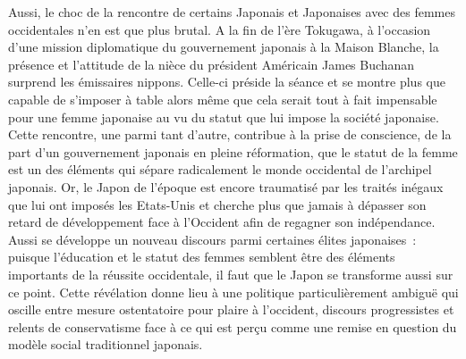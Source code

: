\documentclass[11pt,a4paper]{article}
\begin{document}
Aussi, le choc de la rencontre de certains Japonais et Japonaises avec des femmes occidentales n’en est que plus brutal. A la fin de l’ère Tokugawa, à l’occasion d’une mission diplomatique du gouvernement japonais à la Maison Blanche, la présence et l’attitude de la nièce du président Américain James Buchanan surprend les émissaires nippons. Celle-ci préside la séance et se montre plus que capable de s’imposer à table alors même que cela serait tout à fait impensable pour une femme japonaise au vu du statut que lui impose la société japonaise. Cette rencontre, une parmi tant d’autre, contribue à la prise de conscience, de la part d’un gouvernement japonais en pleine réformation, que le statut de la femme est un des éléments qui sépare radicalement le monde occidental de l’archipel japonais. Or, le Japon de l’époque est encore traumatisé par les traités inégaux que lui ont imposés les Etats-Unis et cherche plus que jamais à dépasser son retard de développement face à l’Occident afin de regagner son indépendance. Aussi se développe un nouveau discours parmi certaines élites japonaises~: puisque l’éducation et le statut des femmes semblent être des éléments importants de la réussite occidentale, il faut que le Japon se transforme aussi sur ce point. Cette révélation donne lieu à une politique particulièrement ambiguë qui oscille entre mesure ostentatoire pour plaire à l’occident, discours progressistes et relents de conservatisme face à ce qui est perçu comme une remise en question du modèle social traditionnel japonais.
\end{document}
